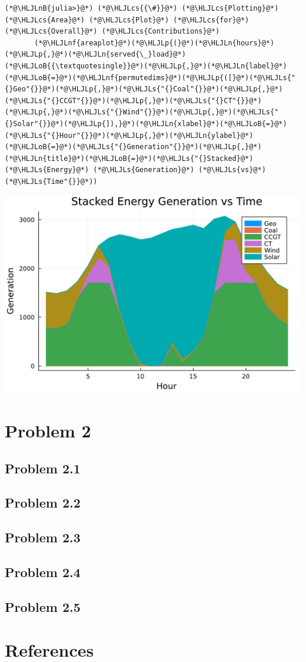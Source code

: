 \documentclass[12pt,a4paper]{article}
\newcommand{\HLJLn}[1]{#1}
\newcommand{\HLJLnf}[1]{\textcolor[RGB]{66,102,213}{#1}}
\newcommand{\HLJLs}[1]{\textcolor[RGB]{201,61,57}{#1}}
\newcommand{\HLJLnB}[1]{\textcolor[RGB]{59,151,46}{#1}}
\newcommand{\HLJLoB}[1]{\textcolor[RGB]{102,102,102}{\textbf{#1}}}
\newcommand{\HLJLp}[1]{#1}
\newcommand{\HLJLcs}[1]{\textcolor[RGB]{153,153,119}{\textit{#1}}}
\begin{document}
\begin{lstlisting}
(*@\HLJLnB{julia>}@*) (*@\HLJLcs{{\#}}@*) (*@\HLJLcs{Plotting}@*) (*@\HLJLcs{Area}@*) (*@\HLJLcs{Plot}@*) (*@\HLJLcs{for}@*) (*@\HLJLcs{Overall}@*) (*@\HLJLcs{Contributions}@*)
       (*@\HLJLnf{areaplot}@*)(*@\HLJLp{(}@*)(*@\HLJLn{hours}@*)(*@\HLJLp{,}@*)(*@\HLJLn{served{\_}load}@*)(*@\HLJLoB{{\textquotesingle}}@*)(*@\HLJLp{,}@*)(*@\HLJLn{label}@*)(*@\HLJLoB{=}@*)(*@\HLJLnf{permutedims}@*)(*@\HLJLp{([}@*)(*@\HLJLs{"{}Geo"{}}@*)(*@\HLJLp{,}@*)(*@\HLJLs{"{}Coal"{}}@*)(*@\HLJLp{,}@*)(*@\HLJLs{"{}CCGT"{}}@*)(*@\HLJLp{,}@*)(*@\HLJLs{"{}CT"{}}@*)(*@\HLJLp{,}@*)(*@\HLJLs{"{}Wind"{}}@*)(*@\HLJLp{,}@*)(*@\HLJLs{"{}Solar"{}}@*)(*@\HLJLp{]),}@*)(*@\HLJLn{xlabel}@*)(*@\HLJLoB{=}@*)(*@\HLJLs{"{}Hour"{}}@*)(*@\HLJLp{,}@*)(*@\HLJLn{ylabel}@*)(*@\HLJLoB{=}@*)(*@\HLJLs{"{}Generation"{}}@*)(*@\HLJLp{,}@*)(*@\HLJLn{title}@*)(*@\HLJLoB{=}@*)(*@\HLJLs{"{}Stacked}@*) (*@\HLJLs{Energy}@*) (*@\HLJLs{Generation}@*) (*@\HLJLs{vs}@*) (*@\HLJLs{Time"{}}@*))
\end{lstlisting}
\includegraphics[width=\linewidth]{figures/as2752_hw3_8_2.pdf}

\section{Problem 2}
\subsection{Problem 2.1}
\subsection{Problem 2.2}
\subsection{Problem 2.3}
\subsection{Problem 2.4}
\subsection{Problem 2.5}
\section{References}
\end{document}
